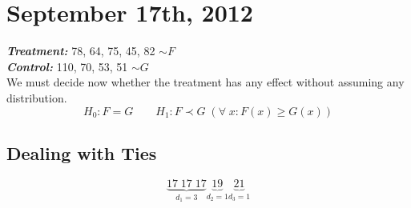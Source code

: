 \documentclass[a4paper,12pt]{amsart}
\begin{document}
\section{September 17th, 2012}
\textbf{\textit{Treatment:}} 78, 64, 75, 45, 82 $\sim F$\\
\textbf{\textit{Control:}} 110, 70, 53, 51 $\sim G$\\
We must decide now whether the treatment has any effect without assuming any distribution.\\
\[H_0: F = G \qquad H_1: F \prec G \;( \forall \; x: F(x) \geq G(x))\]

\subsection{Dealing with Ties}
\[\underbrace{17 \; 17 \; 17}_{d_1 = 3} \underbrace{19}_{d_2 = 1} \underbrace{21}_{d_3=1} \]
\end{document}
